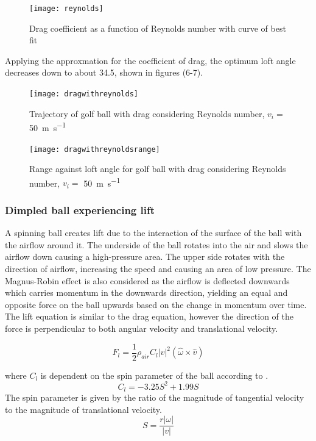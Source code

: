 \documentclass[12pt]{article}
\begin{document}
\begin{figure}[H]
\centering
\caption{Drag coefficient as a function of Reynolds number with curve of best fit}
\texttt{[image: reynolds]}
\end{figure}

Applying the approxmation for the coefficient of drag, the optimum loft angle decreases down to about 34.5\degree, shown in figures (6-7).
\begin{figure}[H]
\centering
\caption{Trajectory of golf ball with drag considering Reynolds number, $v_i=$ \SI{50}{\metre\per\second}}
\texttt{[image: dragwithreynolds]}
\end{figure}

\begin{figure}[H]
\centering
\caption{Range against loft angle for golf ball with drag considering Reynolds number, $v_i=$ \SI{50}{\metre\per\second}}
\texttt{[image: dragwithreynoldsrange]}
\end{figure}


\subsubsection{Dimpled ball experiencing lift}
A spinning ball creates lift due to the interaction of the surface of the ball with the airflow around it. The underside of the ball rotates into the air and slows the airflow down causing a high-pressure area. The upper side rotates with the direction of airflow, increasing the speed and causing an area of low pressure. The Magnus-Robin effect is also considered as the airflow is deflected downwards which carries momentum in the downwards direction, yielding an equal and opposite force on the ball upwards based on the change in momentum over time. 
The lift equation is similar to the drag equation, however the direction of the force is perpendicular to both angular velocity and translational velocity.

\begin{equation} \label{lifteqn}
F_l = \frac{1}{2} \rho_{air} C_{l} |v|^2 (\hat{\omega} \times \hat{v})
\end{equation}

where $C_l$ is dependent on the spin parameter of the ball according to \cite{Bearman1976}.
\begin{equation} \label{clifteqn}
C_l = -3.25 S^2 + 1.99 S
\end{equation}
The spin parameter is given by the ratio of the magnitude of tangential velocity to the magnitude of translational velocity.
\begin{equation} \label{spineqn}
S = \frac{r|\omega|}{|v|}
\end{equation}
\end{document}
